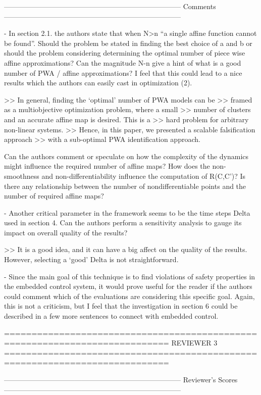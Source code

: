 ---------------------------------------------------------------------------
Comments
---------------------------------------------------------------------------

- In section 2.1. the authors state that when N>n “a single affine function
cannot be found”. Should the problem be stated in finding the best choice of
a and b or should the problem considering determining the optimal number of
piece wise affine approximations? Can the magnitude N-n give a hint of what is
a good number of PWA / affine approximations? I feel that this could lead to a
nice results which the authors can easily cast in optimization (2).

>> In general, finding the `optimal' number of PWA models can be
>> framed as a multiobjective optimization problem, where a small
>> number of clusters and an accurate affine map is desired. This is a
>> hard problem for arbitrary non-linear systems.
>> Hence, in this paper, we presented a scalable falsification approach
>> with a sub-optimal PWA identification approach.


Can the authors comment or speculate on how the complexity of the
dynamics might influence the required number of affine maps? How does
the non-smoothness and non-differentiability influence the computation
of R(C,C’)? Is there any relationship between the number of
nondifferentiable points and the number of required affine maps?


- Another critical parameter in the framework seems to be the time steps Delta
used in section 4. Can the authors perform a sensitivity analysis to gauge its
impact on overall quality of the results?

>> It is a good idea, and it can have a big affect on the quality of
the results. However, selecting a `good' Delta is not straightforward.

- Since the main goal of this technique is to find violations of safety
properties in the embedded control system, it would prove useful for the reader
if the authors could comment which of the evaluations are considering this
specific goal. Again, this is not a criticism, but I feel that the
investigation in section 6 could be described in a few more sentences to
connect with embedded control.


============================================================================
                            REVIEWER 3
============================================================================


---------------------------------------------------------------------------
Reviewer's Scores
---------------------------------------------------------------------------

